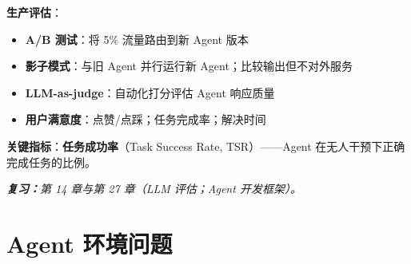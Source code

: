 \begin{questionbox}
\textbf{生产评估}：

\begin{itemize}
  \item \textbf{A/B 测试}：将 5\% 流量路由到新 Agent 版本
  \item \textbf{影子模式}：与旧 Agent 并行运行新 Agent；比较输出但不对外服务
  \item \textbf{LLM-as-judge}：自动化打分评估 Agent 响应质量
  \item \textbf{用户满意度}：点赞/点踩；任务完成率；解决时间
\end{itemize}

\textbf{关键指标}：\textbf{任务成功率}（Task Success Rate, TSR）——Agent 在无人干预下正确完成任务的比例。

\emph{\textbf{复习：}第 14 章与第 27 章（LLM 评估；Agent 开发框架）。}
\end{questionbox}

\section{Agent 环境问题}
\label{agentic-environments-questions}

